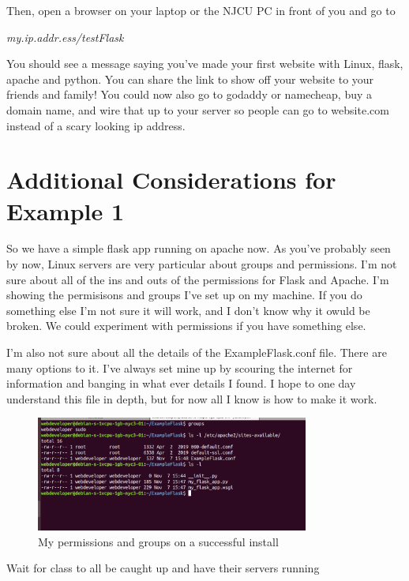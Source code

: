 \documentclass[10pt]{article}
\begin{document}
Then, open a browser on your laptop or the NJCU PC in front of you and go to 

\begin{center}
\textit{my.ip.addr.ess/testFlask}
\end{center}

You should see a message saying you've made your first website with Linux, flask, apache and python. You can share the link to show off your website to your friends and family! You could now also go to godaddy or namecheap, buy a domain name, and wire that up to your server so people can go to website.com instead of a scary looking ip address.

\section{Additional Considerations for Example 1}
So we have a simple flask app running on apache now. As you've probably seen by now, Linux servers are very particular about groups and permissions. I'm not sure about all of the ins and outs of the permissions for Flask and Apache. I'm showing the permisisons and groups I've set up on my machine. If you do something else I'm not sure it will work, and I don't know why it owuld be broken. We could experiment with permissions if you have something else.


I'm also not sure about all the details of the ExampleFlask.conf file. There are many options to it. I've always set mine up by scouring the internet for information and banging in what ever details I found. I hope to one day understand this file in depth, but for now all I know is how to make it work.

\begin{figure}[h]
  \centering
    \includegraphics[width=0.8\textwidth]{groupsAndPermissions.png}
  \caption{My permissions and groups on a successful install}
\end{figure}

{\LARGE Wait for class to all be caught up and have their servers running}
\end{document}
